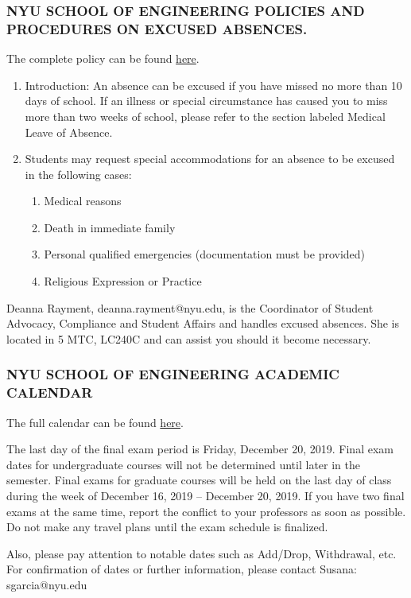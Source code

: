 \documentclass[10pt]{article}
\begin{document}
\subsubsection{NYU SCHOOL OF ENGINEERING POLICIES AND PROCEDURES ON EXCUSED ABSENCES.}
The complete policy can be found \href{https://engineering.nyu.edu/campus-and-community/student-life/office-student-affairs/policies#chapter-id-30199}{here}.
\begin{enumerate}[label=\Alph*.]\itemsep0em 
	\item Introduction:  An absence can be excused if you have missed no more than 10 days of school. If an illness or special circumstance has caused you to miss more than two weeks of school, please refer to the section labeled Medical Leave of Absence.
	
	\item Students may request special accommodations for an absence to be excused in the following cases:

	\begin{enumerate}[label=\arabic*.]\itemsep0em 
		\item	Medical reasons
		\item	Death in immediate family
		\item	Personal qualified emergencies (documentation must be provided)
		\item	Religious Expression or Practice
	
	\end{enumerate}

\end{enumerate}
Deanna Rayment, deanna.rayment@nyu.edu, is the Coordinator of Student Advocacy, Compliance and Student Affairs and handles excused absences. She is located in 5 MTC, LC240C and can assist you should it become necessary. 

\subsubsection{NYU SCHOOL OF ENGINEERING ACADEMIC CALENDAR}
The full calendar can be found \href{https://www.nyu.edu/registrar/calendars/university-academic-calendar.html#1198}{here}.

The last day of the final exam period is Friday, December 20, 2019. Final exam dates for undergraduate courses will not be determined until later in the semester. Final exams for graduate courses will be held on the last day of class during the week of December 16, 2019 -- December 20, 2019.  If you have two final exams at the same time, report the conflict to your professors as soon as possible. Do not make any travel plans until the exam schedule is finalized. 

Also, please pay attention to notable dates such as Add/Drop, Withdrawal, etc. For confirmation of dates or further information, please contact Susana: sgarcia@nyu.edu 
\end{document}
